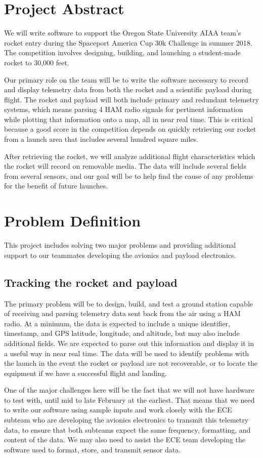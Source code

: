 \documentclass[onecolumn, draftclsnofoot,10pt, compsoc]{IEEEtran}
\begin{document}
\section{Project Abstract}
We will write software to support the Oregon State University AIAA team's rocket entry during the Spaceport America Cup 30k Challenge in summer 2018.  The competition involves designing, building, and launching a student-made rocket to 30,000 feet.
\par
Our primary role on the team will be to write the software necessary to record and display telemetry data from both the rocket and a scientific payload during flight.  The rocket and payload will both include primary and redundant telemetry systems, which means parsing 4 HAM radio signals for pertinent information while plotting that information onto a map, all in near real time.  This is critical because a good score in the competition depends on quickly retrieving our rocket from a launch area that includes several hundred square miles.
\par
After retrieving the rocket, we will analyze additional flight characteristics which the rocket will record on removable media.  The data will include several fields from several sensors, and our goal will be to help find the cause of any problems for the benefit of future launches.
\par

\section{Problem Definition}
This project includes solving two major problems and providing additional support to our teammates developing the avionics and payload electronics.

\subsection{Tracking the rocket and payload}
The primary problem will be to design, build, and test a ground station capable of receiving and parsing telemetry data sent back from the air using a HAM radio.  At a minimum, the data is expected to include a unique identifier, timestamp, and GPS latitude, longitude, and altitude, but may also include additional fields.  We are expected to parse out this information and display it in a useful way in near real time.  The data will be used to identify problems with the launch in the event the rocket or payload are not recoverable, or to locate the equipment if we have a successful flight and landing.
\par
One of the major challenges here will be the fact that we will not have hardware to test with, until mid to late February at the earliest.  That means that we need to write our software using sample inputs and work closely with the ECE subteam who are developing the avionics electronics to transmit this telemetry data, to ensure that both subteams expect the same frequency, formatting, and content of the data.  We may also need to assist the ECE team developing the software used to format, store, and transmit sensor data.
\end{document}
